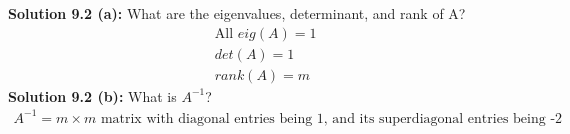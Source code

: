 \documentclass[12pt]{article}
\begin{document}
\noindent \textbf{Solution 9.2 (a): } What are the eigenvalues, determinant, and rank of A? \\
	\begin{align*}
		&\text{All }eig(A) = 1 \\
		&det(A) = 1 \\
		&rank(A) = m 
	\end{align*}
\noindent \textbf{Solution 9.2 (b): } What is $A^{-1}$? \\
	\begin{align*}
		A^{-1} = m \times m \text{ matrix with diagonal entries being 1, and its superdiagonal entries being -2}
	\end{align*}
\end{document}
